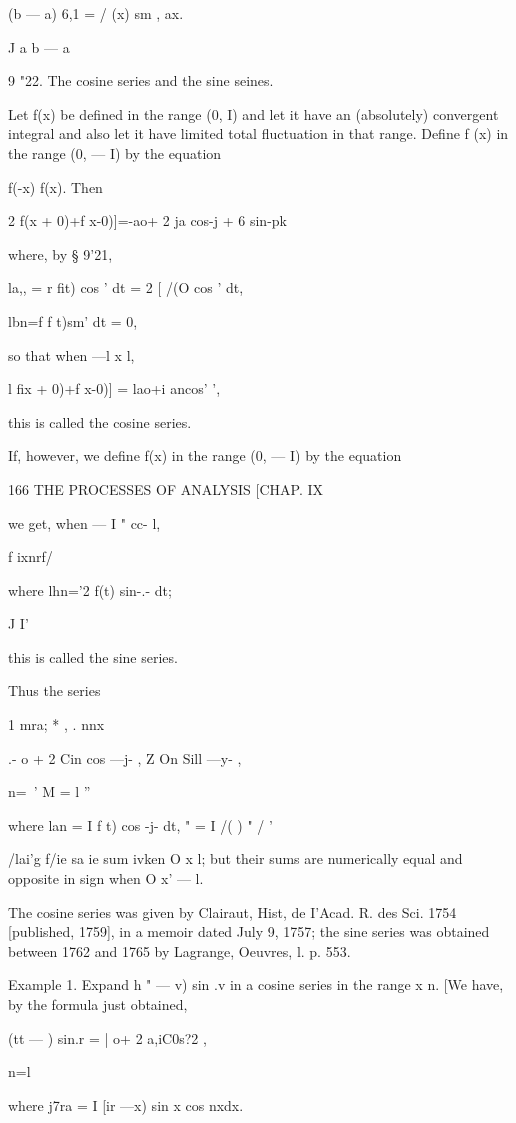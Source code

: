   (b — a) 6,1 = / (x) sm , ax.

  J a b — a

9 "22. The cosine series and the sine seines.

Let f(x) be defined in the range (0, I) and let it have an
(absolutely) convergent integral and also let it have limited total
fluctuation in that range. Define f (x) in the range (0, — I) by the
equation

f(-x) f(x). Then

2 f(x + 0)+f x-0)]=-ao+ 2 ja cos-j + 6 sin-pk

where, by § 9'21,

la,, = r fit) cos ' dt = 2 [ /(O cos ' dt,

lbn=f f t)sm' dt = 0,

so that when —l x l,

l fix + 0)+f x-0)] = lao+i ancos' ',

this is called the cosine series.

If, however, we define f(x) in the range (0, — I) by the equation

166 THE PROCESSES OF ANALYSIS [CHAP. IX

we get, when — I " cc- l,

f ixnrf/

where lhn='2 f(t) sin-.- dt;

J I'

this is called the sine series.

Thus the series

1 mra; * , . nnx

.- o + 2 Cin cos —j- , Z On Sill —y- ,

  n=\ ' M = l ''

where lan = I f t) cos -j- dt, " = I /( ) " / '

/lai'g f/ie sa ie sum ivken O x l; but their sums are numerically
equal and opposite in sign when O x' — l.

The cosine series was given by Clairaut, Hist, de I'Acad. R. des Sci.
1754 [published, 1759], in a memoir dated July 9, 1757; the sine
series was obtained between 1762 and 1765 by Lagrange, Oeuvres, l. p.
553.

Example 1. Expand h " — v) sin .v in a cosine series in the range x n.
[We have, by the formula just obtained,

  (tt — ) sin.r = | o+ 2 a,iC0s?2 ,

n=l

where j7ra = I [ir —x) sin x cos nxdx.

